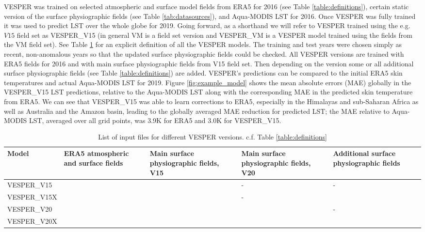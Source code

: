 \documentclass[hess, twostagejnl]{copernicus}
\begin{document}
 \noindent VESPER was trained on selected atmospheric and surface model fields from ERA5 for 2016 (see Table \ref{table:definitions}), certain static version of the surface physiographic fields (see Table \ref{tab:datasources}), and Aqua-MODIS LST for 2016. Once VESPER was fully trained it was used to predict LST over the whole globe for 2019. Going forward, as a shorthand we will refer to VESPER trained using the e.g. $V15$ field set as VESPER\_V15 (in general VM is a field set version and VESPER\_VM is a VESPER model trained using the fields from the VM field set). See Table \ref{tab:vesper_table} for an explicit definition of all the VESPER models. The training and test years were chosen simply as recent, non-anomalous years so that the updated  surface physiographic fields could be checked. All VESPER versions are trained with ERA5 fields for 2016 and with main surface physiographic fields from V15 field set. Then depending on the version some or all additional surface physiographic fields (see Table \ref{table:definitions}) are added. VESPER’s predictions can be compared to the initial ERA5 skin temperatures and actual Aqua-MODIS LST for 2019. Figure \ref{fig:example_model} shows the mean absolute errors (MAE) globally in the VESPER\_V15 LST predictions, relative to the Aqua-MODIS LST along with the corresponding MAE in the predicted skin temperature from ERA5. We can see that VESPER\_V15 was able to learn corrections to ERA5, especially in the Himalayas and sub-Saharan Africa as well as Australia and the Amazon basin, leading to the globally averaged MAE reduction for predicted LST; the MAE relative to  Aqua-MODIS LST, averaged over all grid points, was 3.9K for ERA5 and 3.0K for VESPER\_V15. \newline 
 
 \begin{table}
 	\begin{tabularx}{\textwidth}{lXXXX}
 		\toprule
 		Model & ERA5 atmospheric and surface fields &  Main surface physiographic fields, V15 & Main surface physiographic fields, V20 & Additional surface physiographic fields \\
 		\hline
 		VESPER\_V15 & \checkmark & \checkmark & - & - \\
 		VESPER\_V15X & \checkmark & \checkmark & - & \checkmark \\
 		VESPER\_V20 & \checkmark & \checkmark & \checkmark & - \\
 		VESPER\_V20X & \checkmark & \checkmark & \checkmark & \checkmark \\
 		
 		\bottomrule
 	\end{tabularx}
 	\caption{List of input files for different VESPER versions. c.f. Table \ref{table:definitions}}
 	\label{tab:vesper_table}
 \end{table}
 
\end{document}
